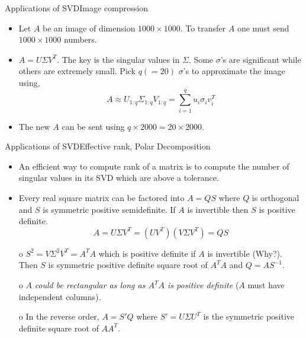 \documentclass{beamer}
\begin{document}
\begin{frame}{Applications of SVD}{Image compression}
\begin{itemize}
    \item {
        Let $A$ be an image of dimension $1000\times 1000$. To transfer $A$ one must send $1000\times1000$ numbers.
    }
    \item {
         $A = U\Sigma V^T$. The key is the singular values in $\Sigma$. Some $\sigma$'s are significant while others are extremely small. Pick $q( = 20)$ $\sigma$'s to approximate the image using,
        \begin{equation*}
            A \approx U_{1:q}\Sigma_{1:q}V_{1:q} = \sum_{i=1}^{q}u_i\sigma_iv_i^T
        \end{equation*}
    }
    \item {
        The new $A$ can be sent using $q \times 2000 = 20 \times 2000$.
    }
\end{itemize}
\end{frame}

\begin{frame}{Applications of SVD}{Effective rank, Polar Decomposition}
\begin{itemize}
    \item An efficient way to compute rank of a matrix is to compute the number of singular values in its SVD which are above a tolerance.
    \item { 
        Every real square matrix can be factored into $A = QS$ where $Q$ is orthogonal and $S$ is symmetric positive semidefinite. If $A$ is invertible then $S$ is positive definite.
        \begin{equation*}
            A = U\Sigma V^T = (UV^T) (V\Sigma V^T) = QS
        \end{equation*}
    }
    \item[o] {
        $S^2 = V\Sigma^2V^T = A^TA$ which is positive definite if $A$ is invertible (Why?). Then $S$ is symmetric positive definite square root of $A^TA$ and $Q = AS^{-1}$.
    }
    \item[o] {
        $A$ \textit{could be rectangular as long as $A^TA$ is positive definite} ($A$ must have independent columns).
    }
    \item[o] {
        In the reverse order, $A = S'Q$ where $S' = U\Sigma U^T$ is the symmetric positive definite square root of $AA^T$.
    }
\end{itemize}
\end{frame}
\end{document}
